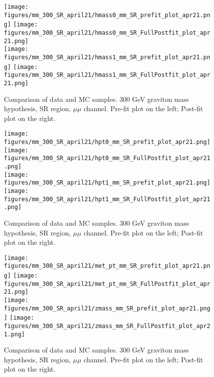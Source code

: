 \begin{figure}[H]
\begin{center}
\texttt{[image: figures/mm\_300\_SR\_april21/hmass0\_mm\_SR\_prefit\_plot\_apr21.png]}
\texttt{[image: figures/mm\_300\_SR\_april21/hmass0\_mm\_SR\_FullPostfit\_plot\_apr21.png]}\\
\texttt{[image: figures/mm\_300\_SR\_april21/hmass1\_mm\_SR\_prefit\_plot\_apr21.png]}
\texttt{[image: figures/mm\_300\_SR\_april21/hmass1\_mm\_SR\_FullPostfit\_plot\_apr21.png]}\\
\caption[Data-MC comparison in the SR.]{Comparison of data and MC samples. 300 GeV graviton mass hypothesis, SR region, $\mu\mu$ channel. Pre-fit plot on the left; Post-fit plot on the right.}
\label{MCcomparisons_mm_low_SR_2}
\end{center}
\end{figure}

\begin{figure}[H]
\begin{center}
\texttt{[image: figures/mm\_300\_SR\_april21/hpt0\_mm\_SR\_prefit\_plot\_apr21.png]}
\texttt{[image: figures/mm\_300\_SR\_april21/hpt0\_mm\_SR\_FullPostfit\_plot\_apr21.png]}\\
\texttt{[image: figures/mm\_300\_SR\_april21/hpt1\_mm\_SR\_prefit\_plot\_apr21.png]}
\texttt{[image: figures/mm\_300\_SR\_april21/hpt1\_mm\_SR\_FullPostfit\_plot\_apr21.png]}\\
\caption[Data-MC comparison in the SR.]{Comparison of data and MC samples. 300 GeV graviton mass hypothesis, SR region, $\mu\mu$ channel. Pre-fit plot on the left; Post-fit plot on the right.}
\label{MCcomparisons_mm_low_SR_3}
\end{center}
\end{figure}


\begin{figure}[H]
\begin{center}
\texttt{[image: figures/mm\_300\_SR\_april21/met\_pt\_mm\_SR\_prefit\_plot\_apr21.png]}
\texttt{[image: figures/mm\_300\_SR\_april21/met\_pt\_mm\_SR\_FullPostfit\_plot\_apr21.png]}\\
\texttt{[image: figures/mm\_300\_SR\_april21/zmass\_mm\_SR\_prefit\_plot\_apr21.png]}
\texttt{[image: figures/mm\_300\_SR\_april21/zmass\_mm\_SR\_FullPostfit\_plot\_apr21.png]}\\
\caption[Data-MC comparison in the SR.]{Comparison of data and MC samples. 300 GeV graviton mass hypothesis, SR region, $\mu\mu$ channel. Pre-fit plot on the left; Post-fit plot on the right.}
\label{MCcomparisons_mm_low_SR_4}
\end{center}
\end{figure}


